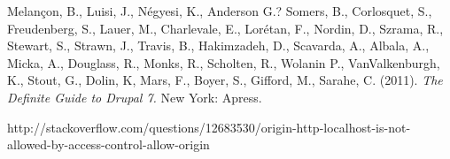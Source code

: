 \begin{thebibliography}{99}

 
 


 Melançon, B., Luisi, J., Négyesi, K., Anderson G.? Somers, B., Corlosquet, S., Freudenberg, S., Lauer, M., Charlevale, E., Lorétan, F., Nordin, D., Szrama, R., Stewart, S., Strawn, J., Travis, B., Hakimzadeh, D., Scavarda, A., Albala, A., Micka, A., Douglass, R., Monks, R., Scholten, R., Wolanin P., VanValkenburgh, K., Stout, G., Dolin, K, Mars, F., Boyer, S., Gifford, M., Sarahe, C. (2011). {\em The Definite Guide to Drupal 7.} New York: Apress.

 http://stackoverflow.com/questions/12683530/origin-http-localhost-is-not-allowed-by-access-control-allow-origin

\end{thebibliography}

